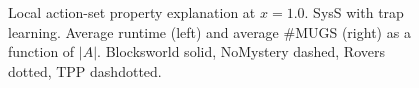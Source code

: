 \begin{figure}[t]
\vspace{-0.0cm}
\small
\centering


\vspace{-0.3cm}
\caption{\label{fig:asp-local} Local action-set property explanation 
at $x=1.0$. SysS with trap learning. Average runtime (left) and
average \#MUGS (right) as a function of $|A|$. Blocksworld solid,
NoMystery dashed, Rovers dotted, TPP dashdotted.
}
\vspace{-0.6cm}
\end{figure}















